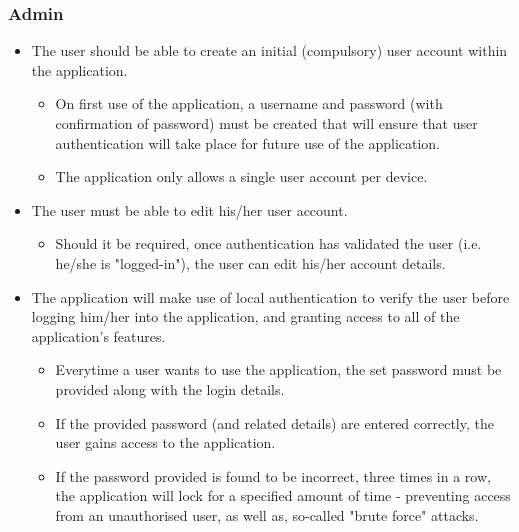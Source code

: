 \subsubsection{Admin}
\begin{itemize}
\item The user should be able to create an initial (compulsory) user account within the application.
\begin{itemize}
\item On first use of the application, a username and password (with confirmation of password) must be created that will ensure that user authentication will take place for future use of the application.
\item The application only allows a single user account per device.
\end{itemize}
\item The user must be able to edit his/her user account.
\begin{itemize}
\item Should it be required, once authentication has validated the user (i.e. he/she is "logged-in"), the user can edit his/her account details.
\end{itemize}
\item The application will make use of local authentication to verify the user before logging him/her into the application, and granting access to all of the application's features.
\begin{itemize}
\item Everytime a user wants to use the application, the set password must be provided along with the login details.
\item If the provided password (and related details) are entered correctly, the user gains access to the application.
\item If the password provided is found to be incorrect, three times in a row, the application will lock for a specified amount of time - preventing access from an unauthorised user, as well as, so-called "brute force" attacks.
\end{itemize}
\end{itemize}

